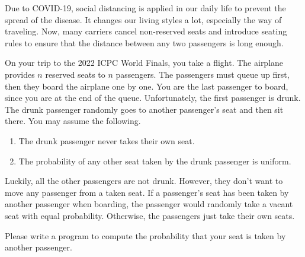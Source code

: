 Due to COVID-19, social distancing is applied in our daily life to prevent
the spread of the disease. It changes our living styles a lot, especially 
the way of traveling. 
Now, many carriers cancel non-reserved seats and introduce seating rules 
to ensure that the distance between any two passengers is long enough.

On your trip to the 2022 ICPC World Finals, you take a flight.
The airplane provides $n$ reserved seats to $n$ passengers.
The passengers must queue up first, then they board the airplane one by one.
You are the last passenger to board, since you are at the end
of the queue.
Unfortunately, the first passenger is drunk.
The drunk passenger randomly goes to another passenger's seat 
and then sit there.
You may assume the following.
\begin{enumerate}
\item The drunk passenger never takes their own seat.
\item The probability of any other seat taken by the drunk passenger is uniform.
\end{enumerate}

Luckily, all the other passengers are not drunk. However, they don't want 
to move any passenger from a taken seat. If a passenger's seat has been taken 
by another passenger when boarding, the passenger would randomly take a 
vacant seat with equal probability. 
Otherwise, the passengers just take their own seats.

Please write a program to compute the probability that your seat is taken
by another passenger.

